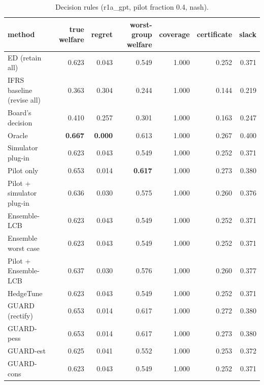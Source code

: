 \begin{table}[t]
\centering
\small
\begin{tabular}{lrrrrrr}
\toprule
method & true welfare & regret & worst-group welfare & coverage & certificate & slack \\
\midrule
ED (retain all) & 0.623 & 0.043 & 0.549 & 1.000 & 0.252 & 0.371 \\
IFRS baseline (revise all) & 0.363 & 0.304 & 0.244 & 1.000 & 0.144 & 0.219 \\
Board's decision & 0.410 & 0.257 & 0.301 & 1.000 & 0.163 & 0.247 \\
Oracle & \textbf{0.667} & \textbf{0.000} & 0.613 & 1.000 & 0.267 & 0.400 \\
Simulator plug-in & 0.623 & 0.043 & 0.549 & 1.000 & 0.252 & 0.371 \\
Pilot only & 0.653 & 0.014 & \textbf{0.617} & 1.000 & 0.273 & 0.380 \\
Pilot + simulator plug-in & 0.636 & 0.030 & 0.575 & 1.000 & 0.260 & 0.376 \\
Ensemble-LCB & 0.623 & 0.043 & 0.549 & 1.000 & 0.252 & 0.371 \\
Ensemble worst case & 0.623 & 0.043 & 0.549 & 1.000 & 0.252 & 0.371 \\
Pilot + Ensemble-LCB & 0.637 & 0.030 & 0.576 & 1.000 & 0.260 & 0.377 \\
HedgeTune & 0.623 & 0.043 & 0.549 & 1.000 & 0.252 & 0.371 \\
GUARD (rectify) & 0.653 & 0.014 & 0.617 & 1.000 & 0.272 & 0.380 \\
GUARD-pess & 0.653 & 0.014 & 0.617 & 1.000 & 0.273 & 0.380 \\
GUARD-est & 0.625 & 0.041 & 0.552 & 1.000 & 0.253 & 0.372 \\
GUARD-cons & 0.623 & 0.043 & 0.549 & 1.000 & 0.252 & 0.371 \\
\bottomrule
\end{tabular}
\caption{Decision rules (r1a\_gpt, pilot fraction 0.4, nash).}
\label{tab:methods-nash}
\end{table}
